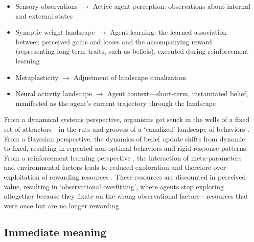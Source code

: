 \begin{itemize}
    \item Sensory observations \(\rightarrow\) Active agent perception: observations about internal and external states
    \item Synaptic weight landscape \(\rightarrow\) Agent learning: the learned association between perceived gains and losses and the accompanying reward (representing long-term traits, such as beliefs), executed during reinforcement learning
    \item Metaplasticity \(\rightarrow\) Adjustment of landscape canalization
    \item Neural activity landscape \(\rightarrow\) Agent context—short-term, instantiated belief, manifested as the agent's current trajectory through the landscape
\end{itemize}

From a dynamical systems perspective, organisms get stuck in the wells of a fixed set of attractors—in the ruts and grooves of a ‘canalized’ landscape of behaviors \parencite{waddington_canalization_1959, carhart-harris_canalization_2023}. From a Bayesian perspective, the dynamics of belief update shifts from dynamic to fixed, resulting in repeated non-optimal behaviors \parencite{harle_anhedonia_2017} and rigid response patterns. From a reinforcement learning perspective \parencite{sutton_reinforcement_1998}, the interaction of meta-parameters and environmental factors leads to reduced exploration and therefore over-exploitation of rewarding resources \parencite{huys_mapping_2013}. These resources are discounted in perceived value, resulting in ‘observational overfitting’, where agents stop exploring altogether because they fixate on the wrong observational factors—resources that were once but are no longer rewarding \parencite{song_observational_2019}.


\subsection{Immediate meaning}


